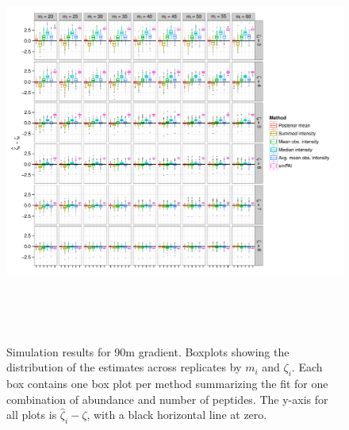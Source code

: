 
\begin{figure}
\centering
\includegraphics[height=5.25in, page=1]{figures/proteomics/figures_boxplot_sim}
\caption{Simulation results for 90m gradient.
Boxplots showing the distribution of the estimates across replicates by $m_i$ and $\zeta_i$.
Each box contains one box plot per method summarizing the fit for one combination of abundance and number of peptides.
The y-axis for all plots is $\hat{\zeta}_i - \zeta$, with a black horizontal line at zero.}
\end{figure}

